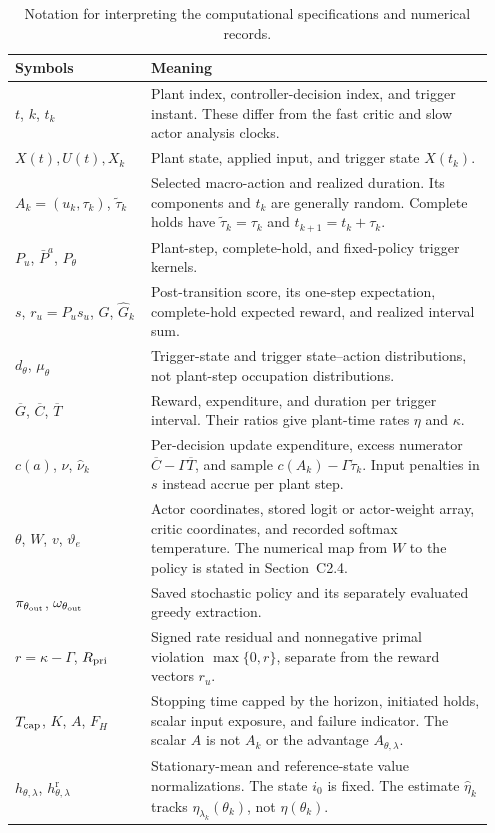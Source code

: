 \documentclass[11pt]{article}
\newcommand{\1}{\mathbf{1}}
\newcommand{\Tbar}{\overline{T}}
\newcommand{\Gbar}{\overline{G}}
\newcommand{\Cbar}{\overline{C}}
\begin{document}
\begin{table}[htbp]
\caption{Notation for interpreting the computational specifications and numerical records.}
\label{comp:tab:notation_clocks}
\centering
\begingroup
\small
\renewcommand{\arraystretch}{1.12}
\begin{tabular}{@{}p{0.27\linewidth}p{0.68\linewidth}@{}}
\toprule
Symbols & Meaning \\
\midrule
$t$, $k$, $t_k$ & Plant index, controller-decision index, and trigger instant. These differ from the fast critic and slow actor analysis clocks. \\
$X(t),U(t),X_k$ & Plant state, applied input, and trigger state $X(t_k)$. \\
$A_k=(u_k,\tau_k)$, $\tilde\tau_k$ & Selected macro-action and realized duration. Its components and $t_k$ are generally random. Complete holds have $\tilde\tau_k=\tau_k$ and $t_{k+1}=t_k+\tau_k$. \\
$P_u$, $\bar P^a$, $P_\theta$ & Plant-step, complete-hold, and fixed-policy trigger kernels. \\
$s$, $r_u=P_us_u$, $G$, $\widehat G_k$ & Post-transition score, its one-step expectation, complete-hold expected reward, and realized interval sum. \\
$d_\theta$, $\mu_\theta$ & Trigger-state and trigger state--action distributions, not plant-step occupation distributions. \\
$\Gbar$, $\Cbar$, $\Tbar$ & Reward, expenditure, and duration per trigger interval. Their ratios give plant-time rates $\eta$ and $\kappa$. \\
$c(a)$, $\nu$, $\widehat\nu_k$ & Per-decision update expenditure, excess numerator $\Cbar-\Gamma\Tbar$, and sample $c(A_k)-\Gamma\tilde\tau_k$. Input penalties in $s$ instead accrue per plant step. \\
$\theta$, $W$, $v$, $\vartheta_e$ & Actor coordinates, stored logit or actor-weight array, critic coordinates, and recorded softmax temperature. The numerical map from $W$ to the policy is stated in Section~C2.4. \\
$\pi_{\theta_{\rm out}}$, $\omega_{\theta_{\rm out}}$ & Saved stochastic policy and its separately evaluated greedy extraction. \\
$r=\kappa-\Gamma$, $R_{\rm pri}$ & Signed rate residual and nonnegative primal violation $\max\{0,r\}$, separate from the reward vectors $r_u$. \\
$T_{\rm cap}$, $K$, $A$, $F_H$ & Stopping time capped by the horizon, initiated holds, scalar input exposure, and failure indicator. The scalar $A$ is not $A_k$ or the advantage $A_{\theta,\lambda}$. \\
$h_{\theta,\lambda}$, $h^{\mathrm r}_{\theta,\lambda}$ & Stationary-mean and reference-state value normalizations. The state $i_0$ is fixed. The estimate $\hat\eta_k$ tracks $\eta_{\lambda_k}(\theta_k)$, not $\eta(\theta_k)$. \\
\bottomrule
\end{tabular}
\endgroup
\end{table}
\end{document}
